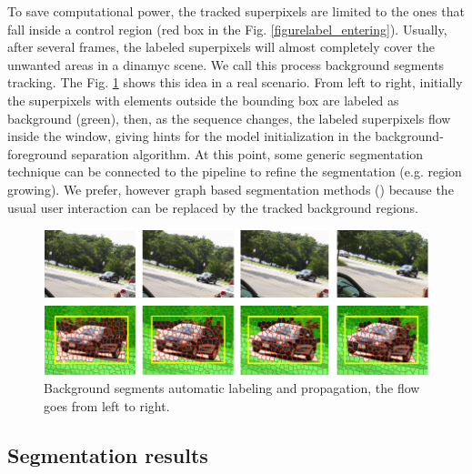 To save computational power, the tracked superpixels are 
limited to the ones that fall inside a control region (red box in the Fig.  \ref{figurelabel_entering}). Usually, after several frames, 
the labeled superpixels will almost completely cover the unwanted areas in a dinamyc scene. We call this process background segments tracking.  The Fig. \ref{figurelabel_spflow} shows this idea in a real scenario. From left to right, initially the superpixels with 
elements outside the bounding box are labeled as background (green), then, as the sequence changes, the labeled superpixels flow inside the window, giving hints for the model initialization in the background-foreground separation algorithm. 
At this point, some generic segmentation technique can be connected to the pipeline to refine the segmentation (e.g. region growing). We prefer, however graph based segmentation methods (\cite{c18}\cite{c15}) because the usual user interaction can be replaced by the tracked background regions.

   \begin{figure}[thpb]
      \centering
      \includegraphics[width=1\textwidth]{../images/suppixflow2.png}
      \caption{Background segments automatic labeling and propagation, the flow goes from left to right.}
      \label{figurelabel_spflow}
   \end{figure}

\subsection{Segmentation results}

